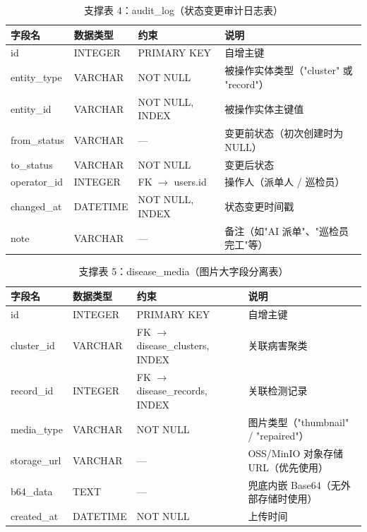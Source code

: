 \documentclass[UTF8, a4paper, fontset=ubuntu]{ctexart}
\begin{document}
\begin{table}[H]
    \centering
    \caption{支撑表 4：audit\_log（状态变更审计日志表）}
    \label{tab:audit_log}
    \begin{tabular}{lp{3cm}lp{5cm}}
        \toprule
        字段名 & 数据类型 & 约束 & 说明 \\ \midrule
        id           & INTEGER  & PRIMARY KEY          & 自增主键 \\
        entity\_type & VARCHAR  & NOT NULL             & 被操作实体类型（"cluster" 或 "record"） \\
        entity\_id   & VARCHAR  & NOT NULL, INDEX      & 被操作实体主键值 \\
        from\_status & VARCHAR  & ---                  & 变更前状态（初次创建时为 NULL） \\
        to\_status   & VARCHAR  & NOT NULL             & 变更后状态 \\
        operator\_id & INTEGER  & FK $\rightarrow$ users.id & 操作人（派单人 / 巡检员） \\
        changed\_at  & DATETIME & NOT NULL, INDEX      & 状态变更时间戳 \\
        note         & VARCHAR  & ---                  & 备注（如"AI 派单"、"巡检员完工"等） \\
        \bottomrule
    \end{tabular}
\end{table}

\begin{table}[H]
    \centering
    \caption{支撑表 5：disease\_media（图片大字段分离表）}
    \label{tab:disease_media}
    \begin{tabular}{lp{3cm}lp{5cm}}
        \toprule
        字段名 & 数据类型 & 约束 & 说明 \\ \midrule
        id          & INTEGER & PRIMARY KEY          & 自增主键 \\
        cluster\_id & VARCHAR & FK $\rightarrow$ disease\_clusters, INDEX & 关联病害聚类 \\
        record\_id  & INTEGER & FK $\rightarrow$ disease\_records, INDEX  & 关联检测记录 \\
        media\_type & VARCHAR & NOT NULL             & 图片类型（"thumbnail" / "repaired"） \\
        storage\_url & VARCHAR & ---                 & OSS/MinIO 对象存储 URL（优先使用） \\
        b64\_data   & TEXT    & ---                  & 兜底内嵌 Base64（无外部存储时使用） \\
        created\_at & DATETIME & NOT NULL            & 上传时间 \\
        \bottomrule
    \end{tabular}
\end{table}
\end{document}
